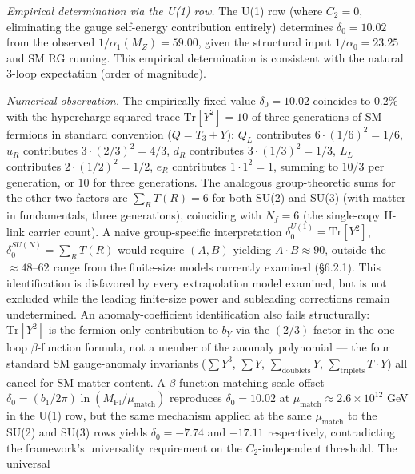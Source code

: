 \documentclass[
]{article}
\begin{document}
\begin{itemize}
  \emph{Empirical determination via the U(1) row.} The U(1) row (where
  \(C_2 = 0\), eliminating the gauge self-energy contribution entirely)
  determines \(\delta_0 = 10.02\) from the observed
  \(1/\alpha_1(M_Z) = 59.00\), given the structural input
  \(1/\alpha_0 = 23.25\) and SM RG running. This empirical determination
  is consistent with the natural 3-loop expectation (order of
  magnitude).

  \emph{Numerical observation.} The empirically-fixed value
  \(\delta_0 = 10.02\) coincides to \(0.2\%\) with the
  hypercharge-squared trace \(\text{Tr}[Y^2] = 10\) of three generations
  of SM fermions in standard convention (\(Q = T_3 + Y\)): \(Q_L\)
  contributes \(6 \cdot (1/6)^2 = 1/6\), \(u_R\) contributes
  \(3 \cdot (2/3)^2 = 4/3\), \(d_R\) contributes
  \(3 \cdot (1/3)^2 = 1/3\), \(L_L\) contributes
  \(2 \cdot (1/2)^2 = 1/2\), \(e_R\) contributes \(1 \cdot 1^2 = 1\),
  summing to \(10/3\) per generation, or \(10\) for three generations.
  The analogous group-theoretic sums for the other two factors are
  \(\sum_R T(R) = 6\) for both SU(2) and SU(3) (with matter in
  fundamentals, three generations), coinciding with \(N_f=6\) (the
  single-copy H-link carrier count). A naive group-specific
  interpretation \(\delta_0^{U(1)} = \text{Tr}[Y^2]\),
  \(\delta_0^{SU(N)} = \sum_R T(R)\) would require \((A, B)\) yielding
  \(A \cdot B \approx 90\), outside the \(\approx 48\)--\(62\) range
  from the finite-size models currently examined (§6.2.1). This
  identification is disfavored by every extrapolation model examined,
  but is not excluded while the leading finite-size power and subleading
  corrections remain undetermined. An anomaly-coefficient identification
  also fails structurally: \(\text{Tr}[Y^2]\) is the fermion-only
  contribution to \(b_Y\) via the \((2/3)\) factor in the one-loop
  \(\beta\)-function formula, not a member of the anomaly polynomial ---
  the four standard SM gauge-anomaly invariants (\(\sum Y^3\),
  \(\sum Y\), \(\sum_{\text{doublets}} Y\),
  \(\sum_{\text{triplets}} T \cdot Y\)) all cancel for SM matter
  content. A \(\beta\)-function matching-scale offset
  \(\delta_0 = (b_1/2\pi) \ln(M_{\text{Pl}}/\mu_{\text{match}})\)
  reproduces \(\delta_0 = 10.02\) at
  \(\mu_{\text{match}} \approx 2.6 \times 10^{12}\) GeV in the U(1) row,
  but the same mechanism applied at the same \(\mu_{\text{match}}\) to
  the SU(2) and SU(3) rows yields \(\delta_0 = -7.74\) and \(-17.11\)
  respectively, contradicting the framework's universality requirement
  on the \(C_2\)-independent threshold. The universal

\end{itemize}
\end{document}
